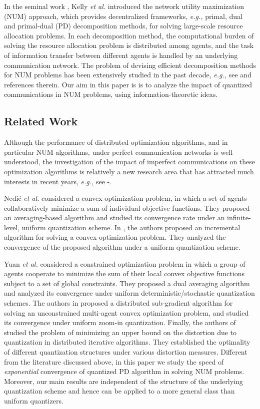 \documentclass[10pt,twocolumn,twoside]{IEEEtran}
\begin{document}
 

In the seminal work \cite{KMT98}, Kelly \emph{et al.} introduced the network utility maximization (NUM) approach, which provides decentralized frameworks, \emph{e.g.,} primal, dual and primal-dual (PD) decomposition methods, for solving large-scale resource allocation problems.    
In each decomposition method, the computational burden of solving the resource allocation problem is distributed among agents, and the task of information transfer between different agents is handled by an underlying communication network. The problem of devising efficient decomposition methods for NUM problems has been extensively studied in the past decade, \emph{e.g.,} see \cite{SS07} and references therein. 
Our aim in this paper is is to analyze the impact of quantized communications in NUM problems, using information-theoretic ideas.

\subsection{Related Work}
Although the performance of distributed optimization algorithms, and in particular NUM algorithms, under perfect communication networks is well understood, 
the investigation of the impact of imperfect communications on these optimization algorithms is relatively a new research area that has attracted much interests in recent years, \emph{e.g.,} see \cite{Nedic08}-\cite{YH14}.

Nedi\'{c} {\em et al.} \cite{Nedic08} considered a convex optimization problem, in which a set of agents collaboratively minimize a sum of individual objective functions. They proposed an averaging-based algorithm and studied its convergence rate under an infinite-level, uniform quantization scheme.  In \cite{Rabbat05}, the authors proposed an incremental algorithm for solving a convex optimization problem. They analyzed the convergence of the proposed algorithm under a uniform quantization scheme.

Yuan \emph{et al.} \cite{YXZR12} considered a constrained optimization problem in which a group of agents cooperate to minimize the sum of their local convex objective functions subject to a set of global constraints. They proposed a dual averaging algorithm and analyzed its convergence under uniform deterministic/stochastic quantization schemes. The authors in \cite{YH14} proposed a distributed sub-gradient algorithm for solving  an unconstrained multi-agent convex optimization problem, and studied its convergence under uniform zoom-in quantization. Finally, the authors of \cite{CL10} studied the problem of minimizing an upper bound on the distortion due to quantization in distributed iterative algorithms. They established  the optimality of different quantization structures under various distortion measures. Different from the literature discussed above, in this paper we study the speed of \emph{exponential} convergence of quantized PD algorithm in solving NUM problems. Moreover, our main results are independent of the structure of the underlying quantization scheme and hence can be applied to a more general class  than uniform quantizers.
\end{document}
